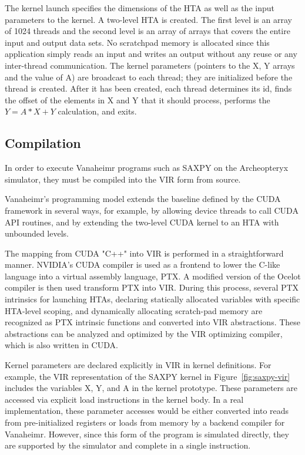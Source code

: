 \documentclass[conference, 10pt]{IEEEtran}
\begin{document}
The kernel launch specifies the dimensions of the HTA as well as the input
parameters to the kernel.  A two-level HTA is created.  The first level is an
array of 1024 threads and the second level is an array of arrays that covers
the entire input and output data sets.  No scratchpad memory is allocated since
this application simply reads an input and writes an output without any reuse
or any inter-thread communication.  The kernel parameters (pointers to the X, Y
arrays and the value of A) are broadcast to each thread; they are initialized
before the thread is created.  After it has been created, each thread determines
its id, finds the offset of the elements in X and Y that it should process,
performs the $Y = A*X+Y$ calculation, and exits.

\subsection{Compilation}

In order to execute Vanaheimr programs such as SAXPY on the Archeopteryx
simulator, they must be compiled into the VIR form from source.  

Vanaheimr's programming model extends the baseline defined by the CUDA framework in
several ways, for example, by allowing device threads to call CUDA API routines,
and by extending the two-level CUDA kernel to an HTA with unbounded levels.



The mapping from CUDA "C++" into VIR is performed in a straightforward manner.
NVIDIA's CUDA compiler is used as a frontend to lower the C-like language into
a virtual assembly language, PTX.  A modified version of the Ocelot compiler is
then used transform PTX into VIR.  During this process, several PTX intrinsics
for launching HTAs, declaring statically allocated variables with specific
HTA-level scoping, and dynamically allocating scratch-pad memory are recognized
as PTX intrinsic functions and converted into VIR abstractions.  These
abstractions can be analyzed and optimized by the VIR optimizing compiler, which
is also written in CUDA.

Kernel parameters are declared explicitly in VIR in kernel definitions. 
For example, the VIR representation of the SAXPY kernel in 
Figure~\ref{fig:saxpy-vir} includes the variables X, Y, and A in the kernel
prototype.  These parameters are accessed via explicit load
instructions in the kernel body. In a real implementation, these parameter
accesses would be either converted into reads from pre-initialized registers or
loads from memory by a backend compiler for Vanaheimr.  However, since this
form of the program is simulated directly, they are supported by the simulator
and complete in a single instruction.
\end{document}
